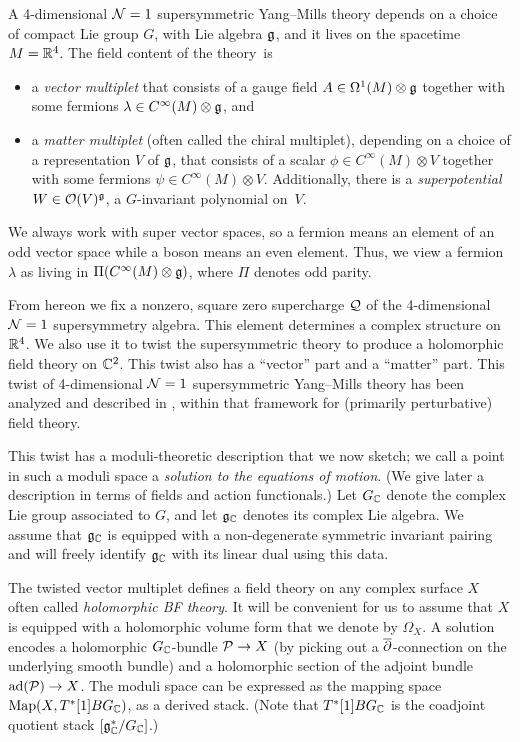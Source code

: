 \documentclass[11pt]{amsart}
\begin{document}
A 4-dimensional $\mathcal N=1$ supersymmetric Yang--Mills theory depends on a choice of compact Lie group $G$, with Lie algebra $\mathfrak g$, 
and it lives on  the spacetime $M=\mathbb R^4$.
The field content of the theory~is
\begin{itemize}
\item a {\it vector multiplet} that consists of a gauge field $A \in \Omega^1(M) \otimes \mathfrak g $ together with some fermions $\lambda \in C^\infty(M) \otimes \mathfrak g$, and
\item a {\it matter multiplet} (often called the chiral multiplet), depending on a choice of a representation $V$ of $\mathfrak g$, that consists of a scalar $\phi \in C^\infty(M) \otimes V$ together with some fermions $\psi \in C^\infty(M) \otimes V$. 
Additionally, there is a {\it superpotential} $W \in \mathcal O(V)^\mathfrak g$, a $G$-invariant polynomial on~$V$. 
\end{itemize}
We always work with super vector spaces, so a fermion means an element of an odd vector space while a boson means an even element.
Thus, we view a fermion $\lambda$ as living in $\Pi (C^\infty(M) \otimes \mathfrak g)$,
where $\Pi$ denotes odd parity.

From hereon we fix a nonzero, square zero supercharge $\mathcal Q$ of the 4-dimensional $\mathcal N=1$ supersymmetry algebra.
This element determines a complex structure on $\mathbb R^4$.
We also use it to twist the supersymmetric theory to produce a holomorphic field theory on $\mathbb C^2$.
This twist also has a ``vector'' part and a ``matter'' part.
This twist of 4-dimensional $\mathcal N=1$ supersymmetric Yang--Mills theory has been analyzed and described in \cite{CosYangian, ESW, SWchar}, within that framework for (primarily perturbative) field theory.

This twist has a moduli-theoretic description that we now sketch;
we call a point in such a moduli space a {\it solution to the equations of motion}. 
(We give later a description in terms of fields and action functionals.)
Let $G_\mathbb C$ denote the complex Lie group associated to $G$,
and let $\mathfrak g_\mathbb C$ denotes its complex Lie algebra.
We assume that $\mathfrak g_\mathbb C$ is equipped with a non-degenerate symmetric invariant pairing and will freely identify $\mathfrak g_\mathbb C$ with its linear dual using this data.

The twisted vector multiplet defines a field theory on any complex surface $X$ often called {\em holomorphic BF theory}. 
It will be convenient for us to assume that $X$ is equipped with a holomorphic volume form that we denote by $\Omega_X$. 
A solution encodes a holomorphic $G_\mathbb C$-bundle $\mathcal P \to X$ (by picking out a ${\overline{\partial}}$-connection on the underlying smooth bundle) and a holomorphic section of the adjoint bundle $\mathrm{ad}(\mathcal P) \to X$.
The moduli space can be expressed as the mapping space ${\rm Map}(X, T^*[1]BG_{\mathbb C})$, as a derived stack.
(Note that $T^*[1]BG_{\mathbb C}$ is the coadjoint quotient stack $[\mathfrak g_\mathbb C^*/G_{\mathbb C}]$.)
\end{document}
